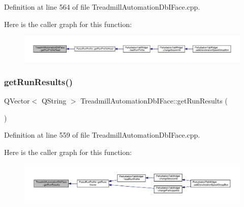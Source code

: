 Definition at line 564 of file Treadmill\+Automation\+Db\+I\+Face.\+cpp.

Here is the caller graph for this function\+:
\nopagebreak
\begin{figure}[H]
\begin{center}
\leavevmode
\includegraphics[width=350pt]{class_treadmill_automation_db_i_face_a6f03f5b75ee2faf2b214cb69198db552_icgraph}
\end{center}
\end{figure}
\mbox{\label{class_treadmill_automation_db_i_face_a26ecd2a6d2099127edd5810bdd4ab72b}} 
\subsubsection{\texorpdfstring{get\+Run\+Results()}{getRunResults()}}
{\footnotesize\ttfamily Q\+Vector$<$ Q\+String $>$ Treadmill\+Automation\+Db\+I\+Face\+::get\+Run\+Results (\begin{DoxyParamCaption}{ }\end{DoxyParamCaption})}



Definition at line 559 of file Treadmill\+Automation\+Db\+I\+Face.\+cpp.

Here is the caller graph for this function\+:
\nopagebreak
\begin{figure}[H]
\begin{center}
\leavevmode
\includegraphics[width=350pt]{class_treadmill_automation_db_i_face_a26ecd2a6d2099127edd5810bdd4ab72b_icgraph}
\end{center}
\end{figure}
\mbox{\label{class_treadmill_automation_db_i_face_a1d66f0701714497573999fabf6a31e80}} 
